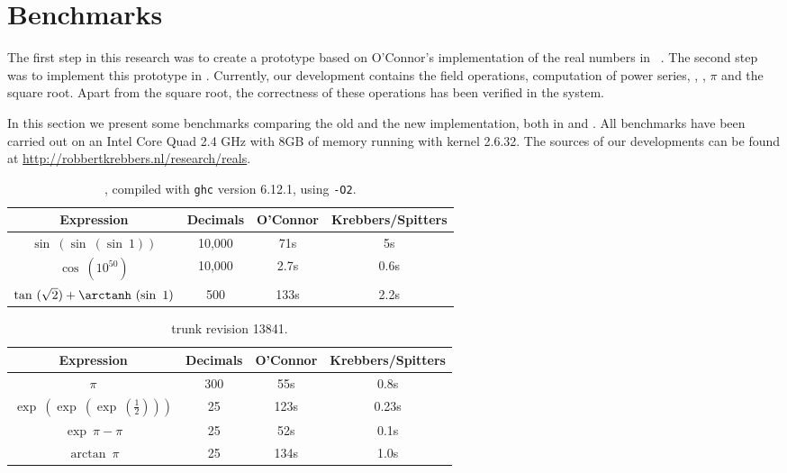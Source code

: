 \documentclass[a4paper,10pt,runningheads]{llncs}
\begin{document}
\section{Benchmarks}\label{section:bench}
The first step in this research was to create a \Haskell{} prototype based on O'Connor's implementation of the real numbers in \Haskell~\cite{OConnor:mscs}. The second step was to implement this prototype in \Coq. Currently, our \Coq{} development contains the field operations, computation of power series, \exp, \arctan, $\pi$ and the square root. Apart from the square root, the correctness of these operations has been verified in the \Coq{} system.

In this section we present some benchmarks comparing the old and the new implementation, both in \Haskell{} and \Coq. All benchmarks have been carried out on an Intel Core Quad 2.4 GHz with 8GB of memory running \DebianFull{} with kernel 2.6.32. The sources of our developments can be found at \url{http://robbertkrebbers.nl/research/reals}. 

\begin{table}[tp]
\centering
\begin{tabular}{|c|c|c|c|}
\hline
Expression & \quad Decimals \quad  & \quad O'Connor \quad & \quad  Krebbers/Spitters \quad  \\
\hline
$\sin\ (\sin\ (\sin\ 1))$ & 10,000 & 71s & 5s\\$\cos\ (10 ^{50})$ & 10,000 & 2.7s & 0.6s\\$\tan\ (\sqrt 2) + \arctanh\ (\sin\ 1)$ & 500 & 133s & 2.2s\\\hline
\end{tabular}
\caption{\Haskell{}, compiled with \texttt{ghc} version 6.12.1, using \texttt{-O2}.}
\label{table:haskellO2}
\end{table}

\begin{table}[tp]
\centering
\begin{tabular}{|c|c|c|c|}
\hline
Expression & \quad Decimals \quad  & \quad O'Connor \quad & \quad  Krebbers/Spitters \quad  \\
\hline
$\pi$ & 300 & 55s & 0.8s\\$\exp\ (\exp\ (\exp\ (\frac 1 2 ))) $ & 25 & 123s & 0.23s\\$\exp\ \pi - \pi$ & 25 & 52s & 0.1s\\$\arctan\ \pi$ & 25 & 134s & 1.0s\\\hline
\end{tabular}
\caption{\Coq{} trunk revision 13841.}
\label{table:coq}
\end{table}
\end{document}
